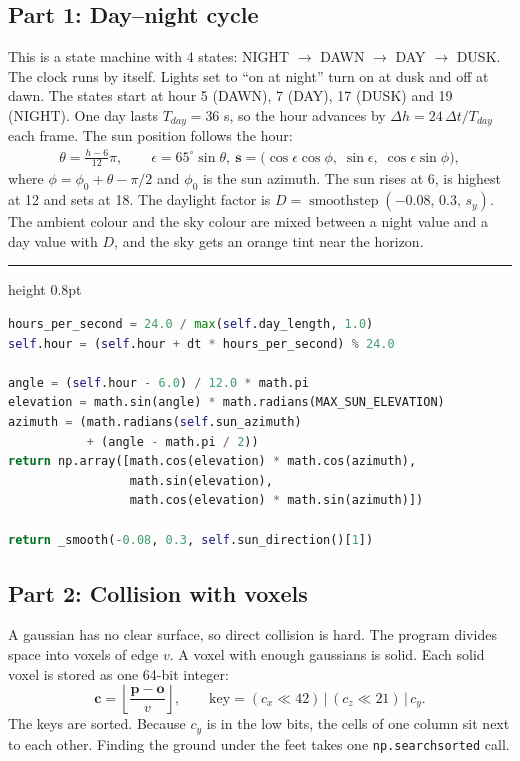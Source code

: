 \documentclass[9pt,twocolumn,a4paper]{extarticle}
\newenvironment{codebox}{\par\vspace{5pt}\noindent\begin{minipage}{\columnwidth}\hrule height 0.8pt\vspace{2pt}}{\end{minipage}\par\vspace{5pt}\noindent\ignorespaces}
\newcommand{\code}[1]{\texttt{#1}}
\begin{document}
\subsection{Part 1: Day--night cycle}
This is a state machine with 4 states: NIGHT $\to$ DAWN $\to$ DAY $\to$ DUSK. The clock runs by itself. Lights set to ``on at night'' turn on at dusk and off at dawn. The states start at hour 5 (DAWN), 7 (DAY), 17 (DUSK) and 19 (NIGHT). One day lasts $T_{day}=36$ s, so the hour advances by $\Delta h = 24\,\Delta t/T_{day}$ each frame. The sun position follows the hour:
\begin{equation}
\begin{gathered}
\theta=\frac{h-6}{12}\pi,\qquad
\epsilon=65^{\circ}\sin\theta,\
\mathbf{s}=\big(\cos\epsilon\cos\phi,\;\sin\epsilon,\;\cos\epsilon\sin\phi\big),
\end{gathered}
\label{eq:sun}
\end{equation}
where $\phi=\phi_0+\theta-\pi/2$ and $\phi_0$ is the sun azimuth. The sun rises at 6, is highest at 12 and sets at 18. The daylight factor is $D=\operatorname{smoothstep}(-0.08,\,0.3,\,s_y)$. The ambient colour and the sky colour are mixed between a night value and a day value with $D$, and the sky gets an orange tint near the horizon.

\begin{codebox}
\begin{lstlisting}[language=Python,caption={\code{core/lighting.py}: hour, sun direction and daylight factor},label={lst:sun}]
hours_per_second = 24.0 / max(self.day_length, 1.0)
self.hour = (self.hour + dt * hours_per_second) % 24.0

angle = (self.hour - 6.0) / 12.0 * math.pi
elevation = math.sin(angle) * math.radians(MAX_SUN_ELEVATION)
azimuth = (math.radians(self.sun_azimuth)
           + (angle - math.pi / 2))
return np.array([math.cos(elevation) * math.cos(azimuth),
                 math.sin(elevation),
                 math.cos(elevation) * math.sin(azimuth)])

return _smooth(-0.08, 0.3, self.sun_direction()[1])
\end{lstlisting}
\end{codebox}

\subsection{Part 2: Collision with voxels}
A gaussian has no clear surface, so direct collision is hard. The program divides space into voxels of edge $v$. A voxel with enough gaussians is solid. Each solid voxel is stored as one 64-bit integer:
\begin{equation}
\mathbf{c} = \left\lfloor \frac{\mathbf{p}-\mathbf{o}}{v} \right\rfloor,
\qquad
\text{key} = (c_x \ll 42)\,|\,(c_z \ll 21)\,|\,c_y.
\label{eq:voxel}
\end{equation}
The keys are sorted. Because $c_y$ is in the low bits, the cells of one column sit next to each other. Finding the ground under the feet takes one \code{np.searchsorted} call.
\end{document}
